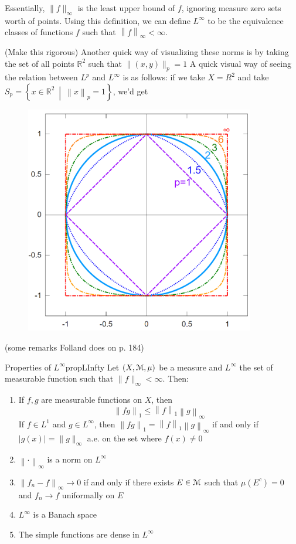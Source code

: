 \documentclass[oneside]{book}
\newcommand{\R}{\mathbb{R}}
\newcommand{\EM}{\EuScript{M}}
\newcommand{\set}[2]{\left\{#1 \ \middle|\ #2\right\}}
\newcommand{\rw}{\rightarrow}
\begin{document}
Essentially, $\| f\|_\infty$ is the least upper bound of $f$, ignoring measure zero sets worth of points.  Using this
definition, we can define $L^\infty$ to be the equivalence classes of functions $f$ such that $\left\| f\right\|_\infty
< \infty$. 

(Make this rigorous) Another quick way of visualizing these norms is by taking the set of all points $\R^2$ such that $\|(x,y)\|_p = 1$
A quick visual way of seeing the relation between $L^p$ and $L^\infty$ is as
follows: if we take $X = R^2$ and take $S_p =  \set{x \in \R^2}{\left\|x\right\|_p = 1}$,
we'd get

\begin{figure}[H]
	\centering
	\includegraphics[width=10cm]{p-norm_example}
\end{figure}

(some remarks Folland does on p. 184)

\begin{prop}{Properties of $L^\infty$}{propLInfty}
	Let $(X, \EM, \mu)$ be a measure and $L^\infty$ the set of measurable function such that $\|f\|_\infty < \infty$.
	Then:
	\begin{enumerate}
		\item If $f,g$ are measurable functions on $X$, then 
			\[
				\left\| fg\right\|_1 \le \left\|f\right\|_1\left\|g\right\|_\infty
			\]
			If $f \in L^1$ and $g \in L^\infty$, then $\left\| fg\right\|_1 =
			\left\|f\right\|_1\left\|g\right\|_\infty$ if and only if $|g(x)| = \|g\|_\infty$ a.e. on the set where
			$f(x) \ne 0$
		\item $\left\|\cdot \right\|_\infty$ is a norm on $L^\infty$
		\item $\left\| f_n -f\right\|_\infty \rw 0$ if and only if there exists $E \in \EM$ such that $\mu(E^c) = 0$ and
			$f_n \rw f$ uniformally on $E$
		\item $L^\infty$ is a Banach space
		\item The simple functions are dense in $L^\infty$
	\end{enumerate}
\end{prop}
\end{document}
